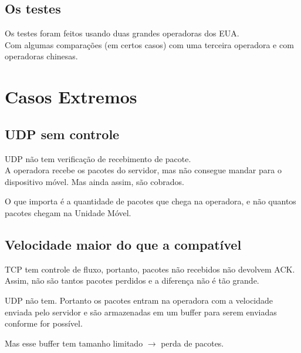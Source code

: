\documentclass[brazil]{beamer}
\begin{document}
\subsection{Os testes}
\begin{frame}[fragile]
    Os testes foram feitos usando duas grandes operadoras dos EUA. \\
    Com algumas comparações (em certos casos) com uma terceira operadora e com operadoras chinesas.
\end{frame}

\section{Casos Extremos}

\subsection{UDP sem controle}

\begin{frame}[fragile]
    UDP não tem verificação de recebimento de pacote. \\
    A operadora recebe os pacotes do servidor, mas não consegue mandar para o dispositivo móvel. Mas ainda assim, são cobrados.
\end{frame}

\begin{frame}[fragile]
    O que importa é a quantidade de pacotes que chega na operadora, e não quantos pacotes chegam na Unidade Móvel.
\end{frame}

\subsection{Velocidade maior do que a compatível}

\begin{frame}[fragile]
    TCP tem controle de fluxo, portanto, pacotes não recebidos não devolvem ACK. Assim, não são tantos pacotes perdidos e a diferença não é tão grande.
    
\end{frame}

\begin{frame}[fragile]
    UDP não tem. Portanto os pacotes entram na operadora com a velocidade enviada pelo servidor e são armazenadas em um buffer para serem enviadas conforme for possível. 

    \vspace{0.3cm}
    Mas esse buffer tem tamanho limitado $\rightarrow$ perda de pacotes.
\end{frame}
\end{document}
